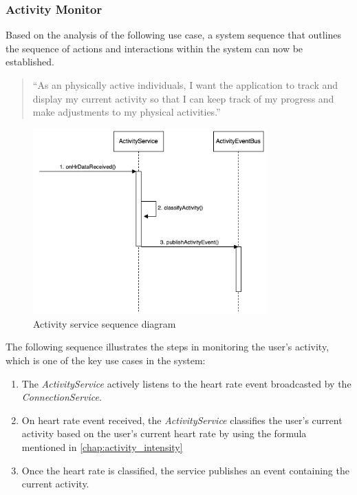 \subsubsection{Activity Monitor}
\label{chap:activity_monitor_design}
Based on the analysis of the following use case, a system sequence that outlines the sequence of actions and interactions within the system can now be established.
\begin{quotation}
    \enquote{As an physically active individuals, I want the application to track and display my current activity so that I can keep track of my progress and make adjustments to my physical activities.} 
\end{quotation}

\begin{figure}[H]
    \centering
    \includegraphics[width=0.8\textwidth]{diagrams/activity-monitor-seq.drawio.png}
    \caption{Activity service sequence diagram}
    \label{fig:activity_diagram}
\end{figure}

The following sequence illustrates the steps in monitoring the user's activity, which is one of the key use cases in the system:
\begin{enumerate}
    \item The \emph{ActivityService} actively listens to the heart rate event broadcasted by the \emph{ConnectionService}.
    \item On heart rate event received, the \emph{ActivityService} classifies the user's current activity based on the user's current heart rate by using the formula mentioned in \autoref{chap:activity_intensity}
    \item Once the heart rate is classified, the service publishes an event containing the current activity.
\end{enumerate}

